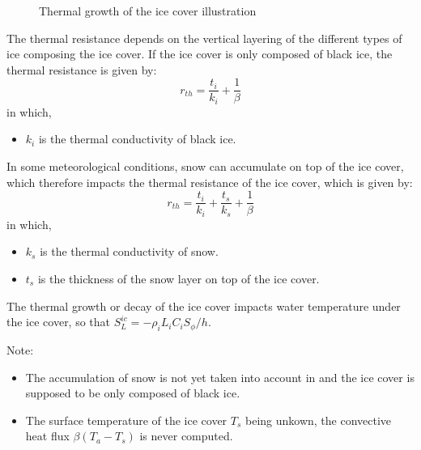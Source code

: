 \begin{figure}[H]
    \begin{center}
    \end{center}
    \caption{Thermal growth of the ice cover illustration}
    \label{fig:icover_growth}
\end{figure}

The thermal resistance depends on the vertical layering of the different types of ice composing the ice cover. If the ice cover is only composed of black ice, the thermal resistance is given by:
\begin{equation} \label{eq:icover_thermal_resistance}
r_{th} = \dfrac{t_i}{k_i} + \dfrac{1}{\beta}
\end{equation}
in which,
\begin{itemize}
    \item $k_i$ is the thermal conductivity of black ice.
\end{itemize}

In some meteorological conditions, snow can accumulate on top of the ice cover, which therefore impacts
the thermal resistance of the ice cover, which is given by:
\begin{equation} \label{eq:icover_thermal_resistance}
r_{th} = \dfrac{t_i}{k_i} + \dfrac{t_s}{k_s} + \dfrac{1}{\beta}
\end{equation}
in which,
\begin{itemize}
    \item $k_s$ is the thermal conductivity of snow.
    \item $t_s$ is the thickness of the snow layer on top of the ice cover.
\end{itemize}

The thermal growth or decay of the ice cover impacts water temperature under the ice cover, so that $S^{ic}_L=-\rho_i L_i C_iS_{\phi}/h$.

\begin{WarningBlock}{Note:}
\begin{itemize}
    \item The accumulation of snow is not yet taken into account in \khione and the ice cover is supposed to be only composed of black ice.
    \item The surface temperature of the ice cover $T_s$ being unkown, the convective heat flux $\beta (T_a-T_s)$ is never computed.
\end{itemize}
\end{WarningBlock}



